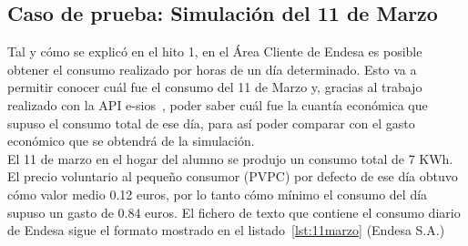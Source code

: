 \subsection{Caso de prueba: Simulación del 11 de Marzo}
Tal y cómo se explicó en el hito 1, en el Área Cliente de Endesa es posible obtener el consumo realizado por horas de un día determinado. Esto va a permitir conocer cuál fue el consumo del 11 de Marzo y, gracias al trabajo realizado con la API e-sios~\cite{Ree}, poder saber cuál fue la cuantía económica que supuso el consumo total de ese día, para así poder comparar con el gasto económico que se obtendrá de la simulación.\\

El 11 de marzo en el hogar del alumno se produjo un consumo total de 7 KWh. El precio voluntario al pequeño consumor (PVPC) por defecto de ese día obtuvo cómo valor medio 0.12 euros, por lo tanto cómo mínimo el consumo del día supuso un gasto de 0.84 euros. El fichero de texto que contiene el consumo diario de Endesa sigue el formato mostrado en el listado~\ref{lst:11marzo} (\textcopyright Endesa S.A.)\\

